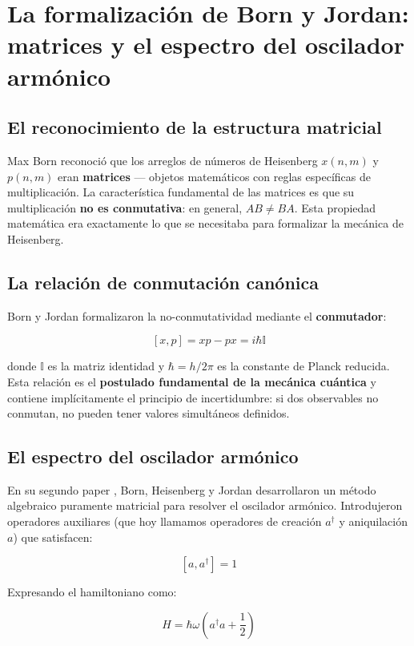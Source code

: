 \documentclass[11pt,a4paper,spanish]{book}
\begin{document}
\section{La formalización de Born y Jordan: matrices y el espectro del oscilador armónico} \label{sec:born}

\subsection*{El reconocimiento de la estructura matricial}

Max Born reconoció que los arreglos de números de Heisenberg $x(n,m)$ y $p(n,m)$ eran \textbf{matrices} — objetos matemáticos con reglas específicas de multiplicación. La característica fundamental de las matrices es que su multiplicación \textbf{no es conmutativa}: en general, $AB \neq BA$. Esta propiedad matemática era exactamente lo que se necesitaba para formalizar la mecánica de Heisenberg.

\subsection*{La relación de conmutación canónica}

Born y Jordan \citep{born1925} formalizaron la no-conmutatividad mediante el \textbf{conmutador}:

\[
[x, p] = xp - px = i\hbar \mathbb{I}
\]

donde $\mathbb{I}$ es la matriz identidad y $\hbar = h/2\pi$ es la constante de Planck reducida. Esta relación es el \textbf{postulado fundamental de la mecánica cuántica} y contiene implícitamente el principio de incertidumbre: si dos observables no conmutan, no pueden tener valores simultáneos definidos.

\subsection*{El espectro del oscilador armónico}

En su segundo paper \citep{bornheisenberg1926}, Born, Heisenberg y Jordan desarrollaron un método algebraico puramente matricial para resolver el oscilador armónico. Introdujeron operadores auxiliares (que hoy llamamos operadores de creación $a^\dagger$ y aniquilación $a$) que satisfacen:

\[
[a, a^\dagger] = 1
\]

Expresando el hamiltoniano como:

\[
H = \hbar\omega\left(a^\dagger a + \frac{1}{2}\right)
\]
\end{document}

